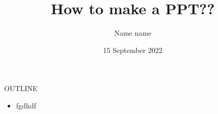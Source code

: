 \documentclass[9pt]{beamer}
\title[PPT]{How to make a PPT??}
\author[NAME]{Name name}
\date[DIT UNIVERSITY]{15 September 2022}
\begin{document}
\begin{frame}
\maketitle
\end{frame}
\begin{frame}
\begin{block}{OUTLINE}
\begin{itemize}
\item fgdhdf
\end{itemize}
\end{block}
\end{frame}
\end{document}
